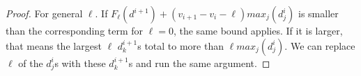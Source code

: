 \documentclass[11pt,letterpaper]{amsart}
\begin{document}
\begin{proof}

























For general $\ell$. If $F_\ell(d^{i+1})+(v_{i+1}-v_i-\ell)max_j(d^i_j)$ is smaller than the corresponding term for $\ell=0$, the same bound applies. If it is larger, that means the largest $\ell$ $d^{i+1}_k$s total to more than $\ell max_j(d^i_j)$. We can replace $\ell$ of the $d^i_j$s with these $d^{i+1}_k$s and run the same argument.  




\end{proof}
\end{document}
